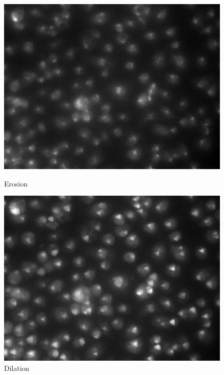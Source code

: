 \documentclass{article}
\begin{document}
\begin{figure}[ht] 
  \label{ fig7} 
  \begin{minipage}[b]{0.5\linewidth}
    \centering
    \includegraphics[width=.95\linewidth]{nuclei_erosion.png} 
    \caption{Erosion} 
    \vspace{4ex}
  \end{minipage}%
  \begin{minipage}[b]{0.5\linewidth}
    \centering
    \includegraphics[width=.95\linewidth]{nuclei_dilation.png} 
    \caption{Dilation} 
    \vspace{4ex}
  \end{minipage} 
  \begin{minipage}[b]{0.5\linewidth}
    \centering

\end{minipage}
\end{figure}
\end{document}
